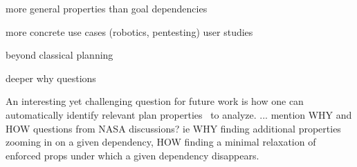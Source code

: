 more general properties than goal dependencies

more concrete use cases (robotics, pentesting) user studies

beyond classical planning

deeper why questions

An interesting yet challenging question for future work is how one can
automatically identify relevant plan properties \props\ to analyze.
... mention WHY and HOW questions from NASA discussions? ie WHY
finding additional properties zooming in on a given dependency, HOW
finding a minimal relaxation of enforced props under which a given
dependency disappears.
